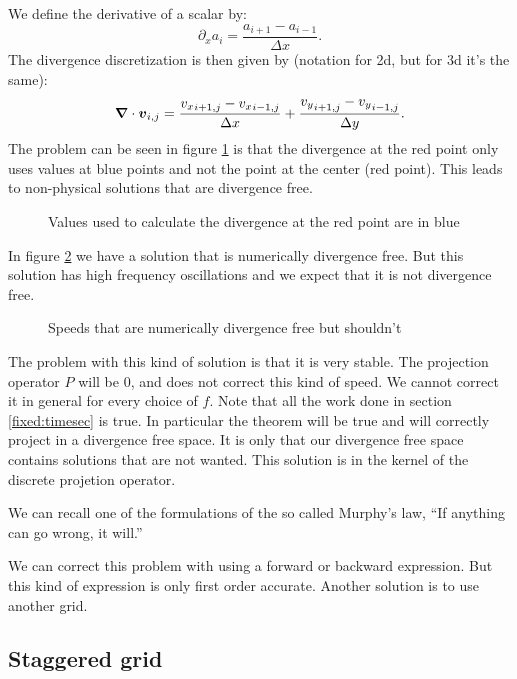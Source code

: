 We define the derivative of a scalar by:
\begin{equation}
  \partial_x a_i=\frac{a_{i+1}-a_{i-1}}{\Delta x}.
\end{equation}
The divergence discretization is then given by (notation for 2d, but for 3d it's the same):
\begin{equation}
  {\boldsymbol {\nabla}} \cdot {\boldsymbol {v}}_{i,j}=\frac{{v_{x}}_{i+1,j}-{v_{x}}_{i-1,j}}{\Delta x}+\frac{{v_{y}}_{i+1,j}-{v_{y}}_{i-1,j}}{\Delta y}.
\end{equation}
The problem can be seen in figure \ref{fixed:unstaggered_div} is that the divergence at the red point only uses values at blue points and not the point at the center (red point).
This leads to  non-physical solutions that are divergence free.

\begin{figure}
\caption{Values used to calculate the divergence at the red point are in blue}
\label{fixed:unstaggered_div}
\end{figure}

In figure \ref{fixed:unstaggered_div2} we have a solution that is numerically divergence free.
But this solution has high frequency oscillations and we expect that it is not divergence free.

\begin{figure}
\caption{Speeds that are numerically divergence free but shouldn't}
\label{fixed:unstaggered_div2}
\end{figure}

The problem with this kind of solution is that it is very stable.
The projection operator $P$ will be 0, and does not correct this kind of speed. We cannot correct it in general for every choice of $f$.
Note that all the work done in section \ref{fixed:timesec} is true. In particular the theorem will be true and will correctly project
in a divergence free space. It is only that our divergence free space contains solutions that are not wanted.
This solution is in the kernel of the discrete projetion operator.

We can recall one of the formulations of the so called Murphy's law, ``If anything can go wrong, it will.''

We can correct this problem with using a forward or backward expression. But this kind of expression is only first order accurate.
Another solution is to use another grid.

\FloatBarrier
\subsection{Staggered grid}

